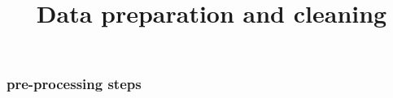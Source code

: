 \documentclass{beamer}
\title{Data preparation and cleaning}
\begin{document}
\begin{frame}
\titlepage
\end{frame}

\begin{frame}
\frametitle{pre-processing steps}
\end{frame}
\end{document}
